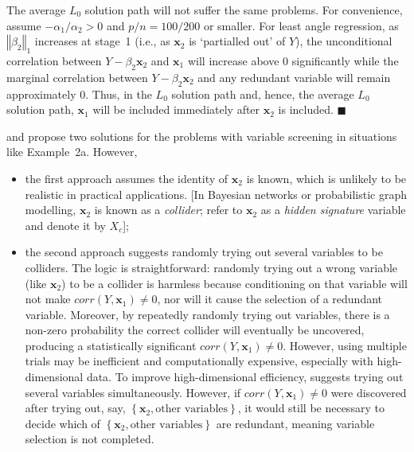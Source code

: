 \documentclass[11pt,review,authoryear]{elsarticle}
\begin{document}
The average $L_0$ solution path will not suffer the same problems. For convenience, assume $-\alpha_1 / \alpha_2 > 0$ and $p/n = 100/200$ or smaller. For least angle regression, as $\left\Vert \beta_2 \right\Vert_1$ increases at stage~1 (i.e., as $\mathbf{x}_2$ is `partialled out' of $Y$), the unconditional correlation between $Y - \beta_2 \mathbf{x}_2$ and $\mathbf{x}_1$ will increase above $0$ significantly while the marginal correlation between $Y - \beta_2 \mathbf{x}_2$ and any redundant variable will remain approximately $0$. Thus, in the $L_0$ solution path and, hence, the average $L_0$ solution path, $\mathbf{x}_1$ will be included immediately after $\mathbf{x}_2$ is included. $\blacksquare$

\citet{fan2008sure} and \citet{barut2016conditional} propose two solutions for the problems with variable screening in situations like Example~2a. However,

\begin{itemize}
  \item the first approach \citep[Section~2.2 and~3]{barut2016conditional} assumes the identity of $\mathbf{x}_2$ is known, which is unlikely to be realistic in practical applications. [In Bayesian networks or probabilistic graph modelling, $\mathbf{x}_2$ is known as a \emph{collider}; \citet{barut2016conditional} refer to $\mathbf{x}_2$ as a \emph{hidden signature} variable and denote it by $X_c$];
  \item the second approach \citep[Section~1 and~2.2]{barut2016conditional} suggests randomly trying out several variables to be colliders. The logic is straightforward: randomly trying out a wrong variable (like $\mathbf{x}_2$) to be a collider is harmless because conditioning on that variable will not make $corr(Y,\mathbf{x}_1) \neq 0$, nor will it cause the selection of a redundant variable. Moreover, by repeatedly randomly trying out variables, there is a non-zero probability the correct collider will eventually be uncovered, producing a statistically significant $corr(Y,\mathbf{x}_1) \neq 0$. However, using multiple trials may be inefficient and computationally expensive, especially with high-dimensional data. To improve high-dimensional efficiency, \citet{barut2016conditional} suggests trying out several variables simultaneously. However, if $corr(Y, \mathbf{x}_1) \neq 0$ were discovered after trying out, say, $\left\{\mathbf{x}_2,\mbox{other variables}\right\}$, it would still be necessary to decide which of $\left\{\mathbf{x}_2,\mbox{other variables}\right\}$ are redundant, meaning variable selection is not completed.
\end{itemize}
\end{document}
